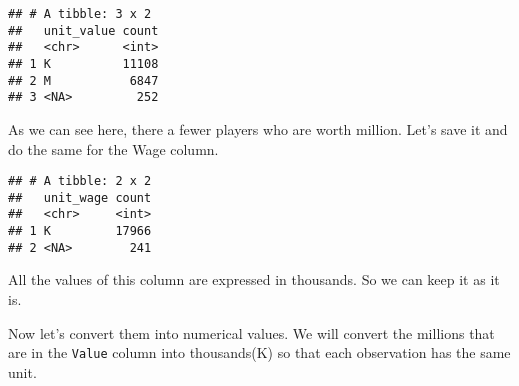 \documentclass[]{article}
\newenvironment{Shaded}{\begin{snugshade}}{\end{snugshade}}
\newcommand{\DataTypeTok}[1]{\textcolor[rgb]{0.13,0.29,0.53}{#1}}
\newcommand{\KeywordTok}[1]{\textcolor[rgb]{0.13,0.29,0.53}{\textbf{#1}}}
\newcommand{\NormalTok}[1]{#1}
\newcommand{\OperatorTok}[1]{\textcolor[rgb]{0.81,0.36,0.00}{\textbf{#1}}}
\newcommand{\StringTok}[1]{\textcolor[rgb]{0.31,0.60,0.02}{#1}}
\begin{document}
\begin{verbatim}
## # A tibble: 3 x 2
##   unit_value count
##   <chr>      <int>
## 1 K          11108
## 2 M           6847
## 3 <NA>         252
\end{verbatim}

As we can see here, there a fewer players who are worth million. Let's
save it and do the same for the Wage column.

\begin{Shaded}
\end{Shaded}

\begin{Shaded}
\end{Shaded}

\begin{verbatim}
## # A tibble: 2 x 2
##   unit_wage count
##   <chr>     <int>
## 1 K         17966
## 2 <NA>        241
\end{verbatim}

All the values of this column are expressed in thousands. So we can keep
it as it is.

Now let's convert them into numerical values. We will convert the
millions that are in the \texttt{Value} column into thousands(K) so that
each observation has the same unit.
\end{document}
